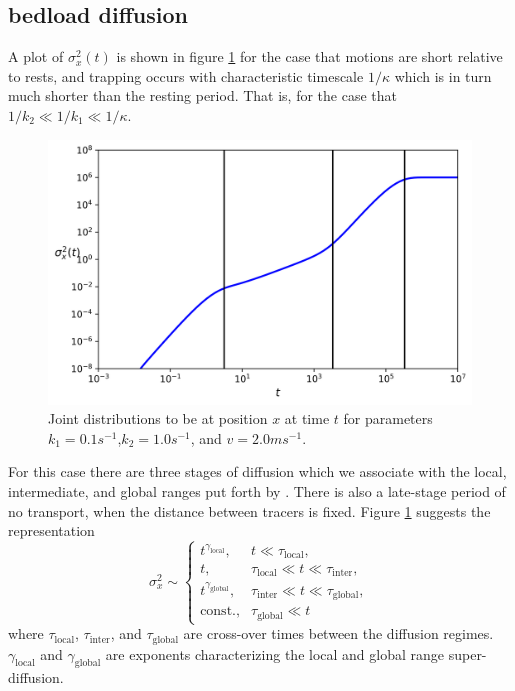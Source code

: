 \documentclass[]{agujournal2018}
\newcommand\be{\begin{equation}}
\newcommand\ee{\end{equation}}
\begin{document}
\subsection{bedload diffusion}
A plot of $\sigma_x^2(t)$ is shown in figure \ref{fig:var} for the case that motions are short relative to rests, and trapping occurs with characteristic timescale $1/\kappa$ which is in turn much shorter than the resting period.
That is, for the case that $1/k_2 \ll 1/k_1 \ll 1/\kappa$.
\begin{figure}[t]
	\includegraphics[width=\linewidth,keepaspectratio]{./figures/diffusion.png}
	\caption{Joint distributions to be at position $x$ at time $t$ for parameters $k_1=0.1s^{-1}$,$k_2=1.0s^{-1}$, and $v=2.0ms^{-1}$.}
	\label{fig:var}
\end{figure}
For this case there are three stages of diffusion which we associate with the local, intermediate, and global ranges put forth by \citet{Nikora2001a}. There is also a late-stage period of no transport, when the distance between tracers is fixed.
Figure \ref{fig:var} suggests the representation
\be \sigma_x^2 \sim
\begin{cases}
t^{\gamma_\text{local}}, & t\ll \tau_\text{local},\\
t, & \tau_\text{local} \ll t \ll \tau_\text{inter}, \\
t^{\gamma_\text{global}}, & \tau_\text{inter} \ll t \ll \tau_\text{global}, \\
\text{const.}, & \tau_\text{global} \ll  t
\end{cases}\ee
where $\tau_\text{local}$, $\tau_\text{inter}$, and $\tau_\text{global}$ are cross-over times between the diffusion regimes.
$\gamma_\text{local}$ and $\gamma_\text{global}$ are exponents characterizing the local and global range super-diffusion.
\end{document}
